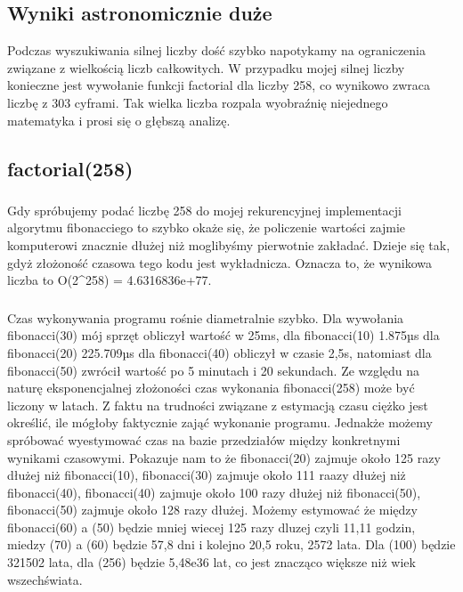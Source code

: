\documentclass{article}
\begin{document}
\subsection{Wyniki astronomicznie duże}
Podczas wyszukiwania silnej liczby dość szybko napotykamy na ograniczenia związane z wielkością liczb całkowitych. W przypadku mojej silnej liczby konieczne jest wywołanie funkcji factorial dla liczby 258, co wynikowo zwraca liczbę z 303 cyframi. Tak wielka liczba rozpala wyobraźnię niejednego matematyka i prosi się o głębszą analizę.

\subsection{factorial(258)}
\subsubsection{}
Gdy spróbujemy podać liczbę 258 do mojej rekurencyjnej implementacji algorytmu fibonacciego to szybko okaże się, że policzenie wartości zajmie komputerowi znacznie dłużej niż moglibyśmy pierwotnie zakładać. Dzieje się tak, gdyż złożoność czasowa tego kodu jest wykładnicza. Oznacza to, że wynikowa liczba to O(2^258) = 4.6316836e+77. 

\subsubsection{}
Czas wykonywania programu rośnie diametralnie szybko. Dla wywołania fibonacci(30) mój sprzęt obliczył wartość w 25ms, dla fibonacci(10) 1.875µs dla fibonacci(20) 225.709µs dla fibonacci(40) obliczył w czasie 2,5s, natomiast dla fibonacci(50) zwrócił wartość po 5 minutach i 20 sekundach. Ze względu na naturę eksponencjalnej złożoności czas wykonania fibonacci(258) może być liczony w latach. Z faktu na trudności związane z estymacją czasu ciężko jest określić, ile mógłoby faktycznie zająć wykonanie programu. Jednakże możemy spróbować wyestymować czas na bazie przedziałów między konkretnymi wynikami czasowymi. Pokazuje nam to że fibonacci(20) zajmuje około 125 razy dłużej niż fibonacci(10), fibonacci(30) zajmuje około 111 raazy dłużej niż fibonacci(40), fibonacci(40) zajmuje około 100 razy dłużej niż fibonacci(50), fibonacci(50) zajmuje około 128 razy dłużej. Możemy estymować że między fibonacci(60) a (50) będzie mniej wiecej 125 razy dluzej czyli 11,11 godzin, miedzy (70) a (60) będzie 57,8 dni i kolejno 20,5 roku, 2572 lata. Dla (100) będzie 321502 lata, dla (256) będzie 5,48e36 lat, co jest znacząco większe niż wiek wszechświata.
\end{document}
